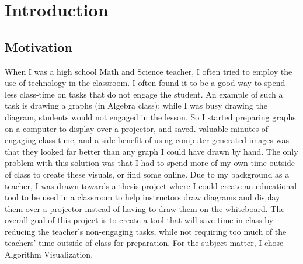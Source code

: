 \chapter{Introduction} 
\section{Motivation}
When I was a high school Math and Science teacher,
I often tried to employ the use of technology in the classroom. 
I often found it to be a good way to spend less class-time on tasks that do not 
engage the student. An example of such a task is drawing a graphs (in Algebra class):
while I was busy drawing the diagram, students would not engaged in the lesson.
\newline\newline
So I started preparing graphs on a computer to display over a projector, and saved.
valuable minutes of engaging class time, 
and a side benefit of using computer-generated images was that they looked far better
than any graph I could have drawn by hand. 
The only problem with this solution was that 
I had to spend more of my own time outside of class to create these visuals, or find
some online.
\newline\newline
Due to my background as a teacher, 
I was drawn towards a thesis project where I could create 
an educational tool to be used in a classroom 
to help instructors draw diagrams and display them 
over a projector instead of having to draw them on the whiteboard.
The overall goal of this project is to create a tool that will save time in class 
by reducing the teacher's non-engaging tasks, while not requiring too much of the 
teachers' time outside of class for preparation. For the subject matter, I chose 
Algorithm Visualization.

